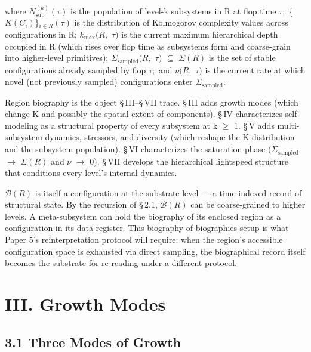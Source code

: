 \documentclass[11pt,oneside]{report}
\theoremstyle{definition}
\theoremstyle{remark}
\begin{document}
where \ensuremath{N_{\mathrm{sub}}^{(k)}(\tau )} is the population of level-k subsystems in R at
flop time \ensuremath{\tau ;} \{\ensuremath{K(C_{i})}\}\ensuremath{_{i \in R}(\tau )} is the distribution of Kolmogorov
complexity values across configurations in R; \ensuremath{k_{\mathrm{max}}(R,} \ensuremath{\tau )} is the
current maximum hierarchical depth occupied in R (which rises over flop
time as subsystems form and coarse-grain into higher-level primitives);
\ensuremath{\Sigma_{\mathrm{sampled}}(R,} \ensuremath{\tau )} \ensuremath{\subseteq} \ensuremath{\Sigma (R)} is the set of stable configurations already
sampled by flop \ensuremath{\tau ;} and \ensuremath{\nu (R,} \ensuremath{\tau )} is the current rate at which novel (not
previously sampled) configurations enter \ensuremath{\Sigma_{\mathrm{sampled}}.}

Region biography is the object \S\,III--\S\,VII trace. \S\,III adds growth modes
(which change K and possibly the spatial extent of components). \S\,IV
characterizes self-modeling as a structural property of every subsystem
at k \ensuremath{\geq} 1. \S\,V adds multi-subsystem dynamics, stressors, and diversity
(which reshape the K-distribution and the subsystem population). \S\,VI
characterizes the saturation phase \ensuremath{(\Sigma_{\mathrm{sampled}}} \ensuremath{\to} \ensuremath{\Sigma (R)} and \ensuremath{\nu} \ensuremath{\to} 0). \S\,VII
develops the hierarchical lightspeed structure that conditions every
level's internal dynamics.

\ensuremath{\mathcal{B}(R)} is itself a configuration at the substrate level --- a time-indexed
record of structural state. By the recursion of \S\,2.1, \ensuremath{\mathcal{B}(R)} can be
coarse-grained to higher levels. A meta-subsystem can hold the biography
of its enclosed region as a configuration in its data register. This
biography-of-biographies setup is what Paper 5's reinterpretation
protocol will require: when the region's accessible configuration space
is exhausted via direct sampling, the biographical record itself becomes
the substrate for re-reading under a different protocol.

\section*{III. Growth Modes}

\subsection*{3.1 Three Modes of Growth}
\end{document}
